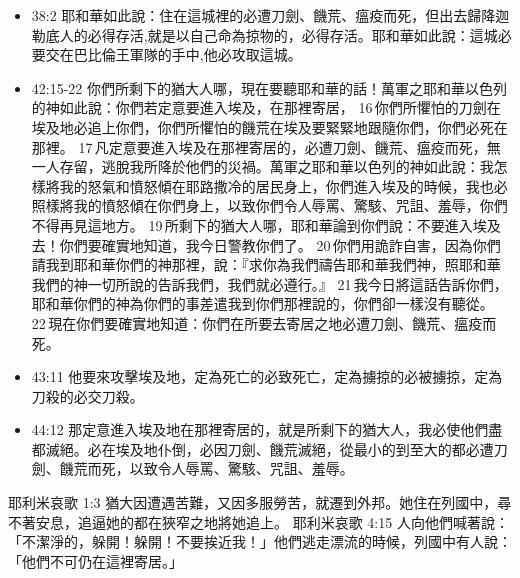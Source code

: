 \begin{itemize}
\item 38:2 耶和華如此說：住在這城裡的必遭刀劍、饑荒、瘟疫而死，但出去歸降迦勒底人的必得存活,就是以自己命為掠物的，必得存活。耶和華如此說：這城必要交在巴比倫王軍隊的手中,他必攻取這城。

\item 42:15-22 你們所剩下的猶大人哪，現在要聽耶和華的話！萬軍之耶和華以色列的神如此說：你們若定意要進入埃及，在那裡寄居， 16 你們所懼怕的刀劍在埃及地必追上你們，你們所懼怕的饑荒在埃及要緊緊地跟隨你們，你們必死在那裡。 17 凡定意要進入埃及在那裡寄居的，必遭刀劍、饑荒、瘟疫而死，無一人存留，逃脫我所降於他們的災禍。萬軍之耶和華以色列的神如此說：我怎樣將我的怒氣和憤怒傾在耶路撒冷的居民身上，你們進入埃及的時候，我也必照樣將我的憤怒傾在你們身上，以致你們令人辱罵、驚駭、咒詛、羞辱，你們不得再見這地方。 19 所剩下的猶大人哪，耶和華論到你們說：不要進入埃及去！你們要確實地知道，我今日警教你們了。 20 你們用詭詐自害，因為你們請我到耶和華你們的神那裡，說：『求你為我們禱告耶和華我們神，照耶和華我們的神一切所說的告訴我們，我們就必遵行。』 21 我今日將這話告訴你們，耶和華你們的神為你們的事差遣我到你們那裡說的，你們卻一樣沒有聽從。 22 現在你們要確實地知道：你們在所要去寄居之地必遭刀劍、饑荒、瘟疫而死。

\item 43:11
他要來攻擊埃及地，定為死亡的必致死亡，定為擄掠的必被擄掠，定為刀殺的必交刀殺。

\item 44:12
那定意進入埃及地在那裡寄居的，就是所剩下的猶大人，我必使他們盡都滅絕。必在埃及地仆倒，必因刀劍、饑荒滅絕，從最小的到至大的都必遭刀劍、饑荒而死，以致令人辱罵、驚駭、咒詛、羞辱。

\end{itemize}


耶利米哀歌 1:3
猶大因遭遇苦難，又因多服勞苦，就遷到外邦。她住在列國中，尋不著安息，追逼她的都在狹窄之地將她追上。
耶利米哀歌 4:15
人向他們喊著說：「不潔淨的，躲開！躲開！不要挨近我！」他們逃走漂流的時候，列國中有人說：「他們不可仍在這裡寄居。」




